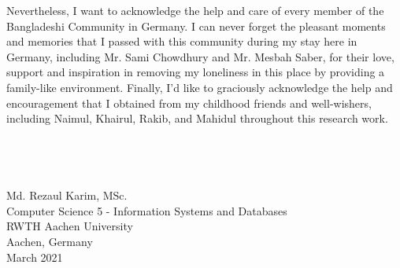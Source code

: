 \begin{acknowledgements}
    \hspace*{5mm} Nevertheless, I want to acknowledge the help and care of every member of the Bangladeshi Community in Germany. I can never forget the pleasant moments and memories that I passed with this community during my stay here in Germany, including Mr. Sami Chowdhury and Mr. Mesbah Saber, for their love, support and inspiration in removing my loneliness in this place by providing a family-like environment. Finally, I'd like to graciously acknowledge the help and encouragement that I obtained from my childhood friends and well-wishers, including Naimul, Khairul, Rakib, and Mahidul throughout this research work. \\ \\ %
    \\ \\ \\ 
    \flushright Md. Rezaul Karim, MSc. \\
    Computer Science 5 - Information Systems and Databases\\
    RWTH Aachen University\\ 
    Aachen, Germany \\
    March 2021
\end{acknowledgements}